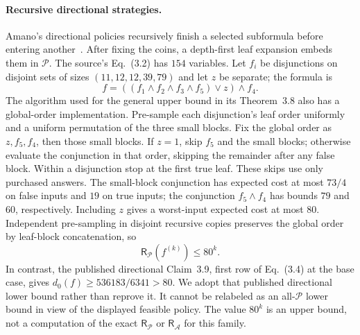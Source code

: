 \documentclass[pdflatex,sn-mathphys-num]{sn-jnl}
\newcommand{\RR}{\mathsf{R}}
\theoremstyle{thmstyleone}
\theoremstyle{thmstylethree}
\theoremstyle{thmstyletwo}
\begin{document}
\paragraph*{Recursive directional strategies.}
Amano's directional policies recursively finish a selected subformula
before entering another~\cite{amano2011directional}. After fixing the
coins, a depth-first leaf expansion embeds them in $\mathcal P$.
The source's Eq.~(3.2) has $154$ variables. Let $f_i$ be disjunctions
on disjoint sets of sizes $(11,12,12,39,79)$ and let $z$ be separate;
the formula is
\[
 f=((f_1\land f_2\land f_3\land f_5)\lor z)\land f_4.
\]
The algorithm used for the general upper bound in its Theorem~3.8
also has a global-order implementation. Pre-sample each disjunction's
leaf order uniformly and a uniform permutation of the three small
blocks. Fix the global order as $z,f_5,f_4$, then those small blocks.
If $z=1$, skip $f_5$ and the small blocks; otherwise evaluate the
conjunction in that order, skipping the remainder after any false
block. Within a disjunction stop at the first true leaf. These skips
use only purchased answers. The small-block conjunction has expected
cost at most $73/4$ on false inputs and $19$ on true inputs; the
conjunction $f_5\land f_4$ has bounds $79$ and $60$, respectively.
Including $z$ gives a worst-input expected cost at most $80$.
Independent pre-sampling in disjoint recursive copies preserves the
global order by leaf-block concatenation, so
\[
 \RR_{\mathcal P}(f^{(k)})\leq80^k.
\]
In contrast, the published directional Claim~3.9, first row of
Eq.~(3.4) at the base case, gives
$d_0(f)\geq536183/6341>80$. We adopt that published directional
lower bound rather than reprove it. It cannot be relabeled as an
all-$\mathcal P$ lower bound in view of the displayed feasible policy.
The value $80^k$ is an upper bound, not a computation of the exact
$\RR_{\mathcal P}$ or $\RR_{\mathcal A}$ for this family.
\end{document}
